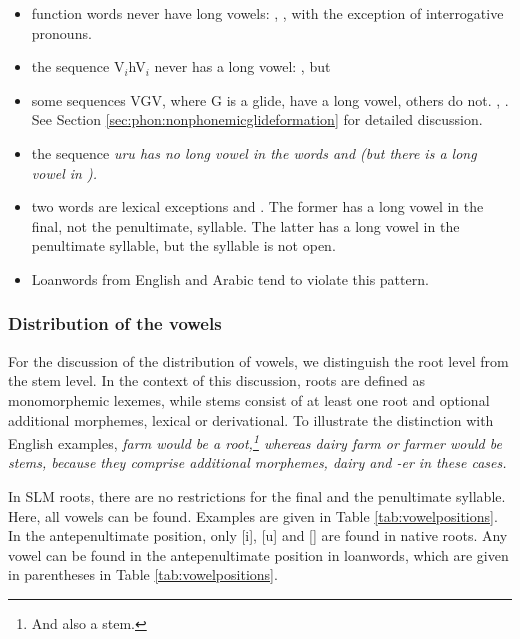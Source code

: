 \begin{itemize}
 \item function words never have long vowels: , , with the exception of interrogative pronouns.
\item the sequence V$_i$hV$_i$ never has a long vowel: , but 
\item some sequences VGV, where G is a glide, have a long vowel, others do not. , . See Section \ref{sec:phon:nonphonemicglideformation} for detailed discussion.
\item the sequence \em uru \em has no long vowel in the words   and  (but there is a long vowel in  ).
\item two words are lexical exceptions  and . The former has a long vowel in the final, not the penultimate, syllable. The latter has a long vowel in the penultimate syllable, but the syllable is not open.
\item Loanwords from English and Arabic tend to violate this pattern.
\end{itemize}


 

\subsubsection{Distribution of the vowels}\label{sec:phon:Distributionofthevowels}
For the discussion of the distribution of vowels, we distinguish the root level from the stem level. In the context of this discussion, roots are defined as monomorphemic lexemes, while stems consist of at least one root and optional additional morphemes, lexical or derivational. To illustrate the distinction with English examples, \em farm \em would be a root,\footnote{And also a stem.} whereas \em dairy farm \em or \em farmer \em would be stems, because they comprise additional morphemes, \em dairy \em and \em -er \em in these cases.

In SLM roots, there are no restrictions for the final and the penultimate syllable. Here, all vowels can be found. Examples are given in Table \ref{tab:vowelpositions}. In the antepenultimate position, only [i], [u] and [\E] are found in native roots. Any vowel can be found in the antepenultimate position in loanwords, which are given in parentheses in Table \ref{tab:vowelpositions}.

